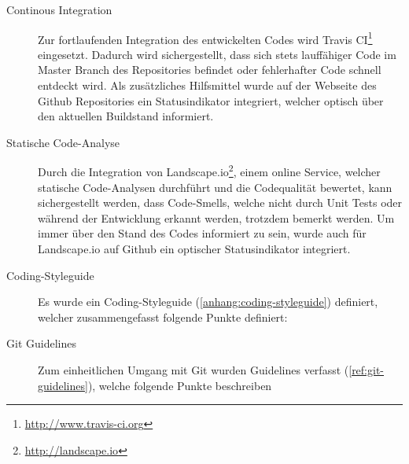 \begin{description}
	\item[Continous Integration] Zur fortlaufenden Integration des entwickelten
	Codes wird Travis CI\footnote{\url{http://www.travis-ci.org}} eingesetzt.
	Dadurch wird sichergestellt, dass sich stets lauffähiger Code im Master Branch
	des Repositories befindet oder fehlerhafter Code schnell entdeckt wird. Als
	zusätzliches Hilfsmittel wurde auf der Webseite des Github Repositories ein
	Statusindikator integriert, welcher optisch über den aktuellen Buildstand
	informiert.

	\item[Statische Code-Analyse] Durch die Integration von
	Landscape.io\footnote{\url{http://landscape.io}}, einem online Service, welcher
	statische Code-Analysen durchführt und die Codequalität bewertet, kann
	sichergestellt werden, dass Code-Smells, welche nicht durch Unit Tests oder
	während der Entwicklung erkannt werden, trotzdem bemerkt werden. Um immer über
	den Stand des Codes informiert zu sein, wurde auch für Landscape.io auf Github
	ein optischer Statusindikator integriert.

	\item[Coding-Styleguide] Es wurde ein Coding-Styleguide
	(\autoref{anhang:coding-styleguide}) definiert, welcher zusammengefasst folgende
	Punkte definiert:

	\item[Git Guidelines] Zum einheitlichen Umgang mit Git wurden Guidelines
	verfasst (\autoref{ref:git-guidelines}), welche folgende Punkte
	beschreiben

\end{description}
